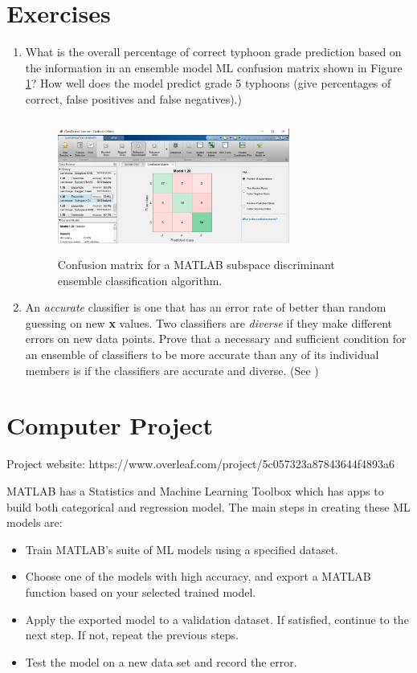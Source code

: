 \documentclass{SBCbookchapter}
\begin{document}
\section{Exercises}  

\begin{enumerate}
	\item What is the overall percentage of correct typhoon grade prediction based on the information in an ensemble model ML confusion matrix shown in Figure \ref{EnsembleClass}? How well does the model predict grade 5 typhoons (give percentages of correct, false positives and false negatives).)
\begin{figure}[!htpb]
	\centering
	\includegraphics[width=3in,height=1.75in]{Ensemblefig1.png}
	\caption{Confusion matrix for a MATLAB subspace discriminant ensemble classification algorithm.}
	\label{EnsembleClass}
\end{figure}

\item An \emph{accurate} classifier is one that has an
error rate of better than random guessing on new {\bf x} values. Two classifiers are \emph{diverse} if they make different errors on new data points. Prove that a necessary and sufficient condition for an ensemble of classifiers to be more
accurate than any of its individual members is if the classifiers are accurate and
diverse. (See \cite{Hansen}) 
 

\end{enumerate}

\section{Computer Project}
{\flushleft Project website: 
https://www.overleaf.com/project/5c057323a87843644f4893a6}


MATLAB has a Statistics and Machine Learning Toolbox which has apps to build both categorical and regression model.  The main steps in creating these ML models are:

\begin{itemize}
	\item Train MATLAB's suite of ML models using a specified dataset.
	\item Choose one of the models with high accuracy, and export a MATLAB function based on your selected trained model.
	\item Apply the exported model to a validation dataset.
	 If satisfied, continue to the next step. If not, repeat the previous steps.
	 \item Test the model on a new data set and record the error. 
	\end{itemize} 
\end{document}
